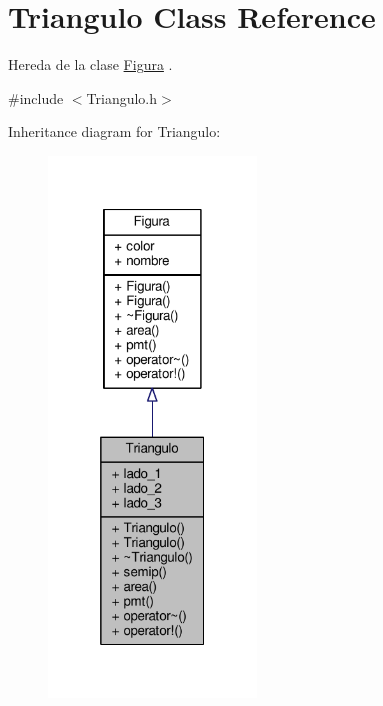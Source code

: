 \hypertarget{class_triangulo}{\section{Triangulo Class Reference}
\label{class_triangulo}
}


Hereda de la clase \hyperlink{class_figura}{Figura} .  




{\ttfamily \#include $<$Triangulo.\+h$>$}



Inheritance diagram for Triangulo\+:
\nopagebreak
\begin{figure}[H]
\begin{center}
\leavevmode
\includegraphics[width=157pt]{class_triangulo__inherit__graph}
\end{center}
\end{figure}
